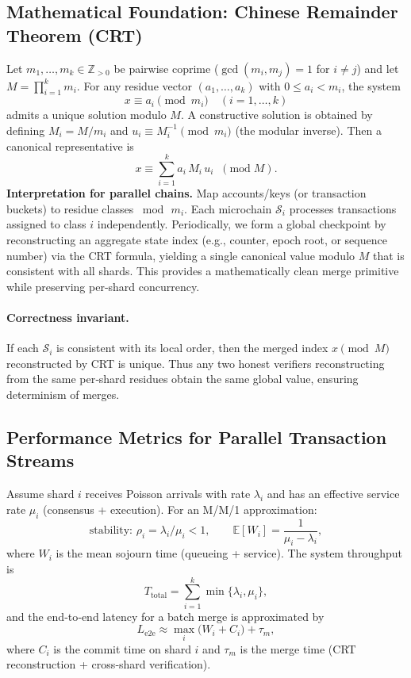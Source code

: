 \documentclass[12pt,onecolumn]{IEEEtran} %
\begin{document}
\subsection{Mathematical Foundation: Chinese Remainder Theorem (CRT)}
\label{sec:CRT}

Let $m_1,\dots,m_k\in\mathbb{Z}_{>0}$ be pairwise coprime ($\gcd(m_i,m_j)=1$ for $i\neq j$) and let $M=\prod_{i=1}^k m_i$.
For any residue vector $(a_1,\dots,a_k)$ with $0\le a_i<m_i$, the system
\[
x \equiv a_i \pmod{m_i}\quad (i=1,\dots,k)
\]
admits a unique solution modulo $M$.
A constructive solution is obtained by defining $M_i = M/m_i$ and $u_i\equiv M_i^{-1}\pmod{m_i}$ (the modular inverse).
Then a canonical representative is
\[
x \equiv \sum_{i=1}^k a_i \, M_i \, u_i \;\;(\mathrm{mod}\; M).
\]
\textbf{Interpretation for parallel chains.} Map accounts/keys (or transaction buckets) to residue classes $\bmod\,m_i$. Each microchain $\mathcal{S}_i$ processes transactions assigned to class $i$ independently. Periodically, we form a global checkpoint by reconstructing an aggregate state index (e.g., counter, epoch root, or sequence number) via the CRT formula, yielding a single canonical value modulo $M$ that is consistent with all shards. This provides a mathematically clean merge primitive while preserving per‑shard concurrency.

\paragraph{Correctness invariant.}
If each $\mathcal{S}_i$ is consistent with its local order, then the merged index $x\pmod{M}$ reconstructed by CRT is unique. Thus any two honest verifiers reconstructing from the same per‑shard residues obtain the same global value, ensuring determinism of merges.

\subsection{Performance Metrics for Parallel Transaction Streams}
\label{sec:crt-perf}

Assume shard $i$ receives Poisson arrivals with rate $\lambda_i$ and has an effective service rate $\mu_i$ (consensus + execution). For an M/M/1 approximation:
\[
\text{stability: } \rho_i=\lambda_i/\mu_i<1,\qquad \mathbb{E}[W_i] = \frac{1}{\mu_i-\lambda_i},
\]
where $W_i$ is the mean sojourn time (queueing + service). The system throughput is
\[
T_{\mathrm{total}} = \sum_{i=1}^k \min\{\lambda_i,\mu_i\},
\]
and the end‑to‑end latency for a batch merge is approximated by
\[
L_{\mathrm{e2e}} \approx \max_{i}\big(W_i + C_i\big) + \tau_m,
\]
where $C_i$ is the commit time on shard $i$ and $\tau_m$ is the merge time (CRT reconstruction + cross‑shard verification).
\end{document}

